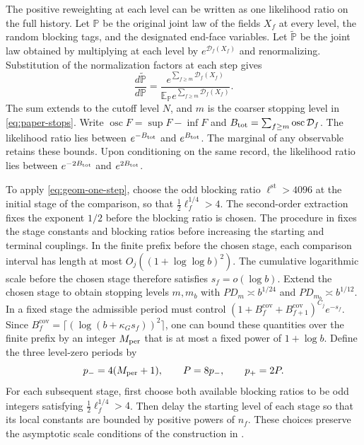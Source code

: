 \documentclass[11pt,a4paper]{article}
\numberwithin{equation}{section}
\begin{document}
The positive reweighting at each level can be written as one likelihood ratio on the full history. Let \(\mathbb P\) be the original joint law of the fields \(X_f\) at every level, the random blocking tags, and the designated end-face variables. Let \(\widetilde{\mathbb P}\) be the joint law obtained by multiplying at each level by \(e^{\mathcal D_f(X_f)}\) and renormalizing. Substitution of the normalization factors at each step gives
\begin{equation}
 \frac{d\widetilde{\mathbb P}}{d\mathbb P}
 =\frac{e^{\sum_{f\ge m}\mathcal D_f(X_f)}}
        {\mathbb E_{\mathbb P}e^{\sum_{f\ge m}\mathcal D_f(X_f)}} .
 \label{eq:geom-history-resets}
\end{equation}
The sum extends to the cutoff level \(N\), and \(m\) is the coarser stopping level in \eqref{eq:paper-stops}. Write \(\operatorname{osc}F=\sup F-\inf F\) and \(B_{\rm tot}=\sum_{f\ge m}\operatorname{osc}\mathcal D_f\). The likelihood ratio lies between \(e^{-B_{\rm tot}}\) and \(e^{B_{\rm tot}}\). The marginal of any observable retains these bounds. Upon conditioning on the same record, the likelihood ratio lies between \(e^{-2B_{\rm tot}}\) and \(e^{2B_{\rm tot}}\).

To apply \eqref{eq:geom-one-step}, choose the odd blocking ratio \(\ell^{\mathrm{st}}>4096\) at the initial stage of the comparison, so that \(\tfrac12\ell_f^{1/4}>4\). The second-order extraction fixes the exponent \(1/2\) before the blocking ratio is chosen. The procedure in \cite[Table 3]{armstrong} fixes the stage constants and blocking ratios before increasing the starting and terminal couplings. In the finite prefix before the chosen stage, each comparison interval has length at most \(O_j((1+\log\log b)^2)\). The cumulative logarithmic scale before the chosen stage therefore satisfies \(s_f=o(\log b)\). Extend the chosen stage to obtain stopping levels \(m,m_b\) with \(PD_m\asymp b^{1/24}\) and \(PD_{m_b}\asymp b^{1/12}\). In a fixed stage the admissible period must control \((1+B_f^{\mathrm{cov}}+B_{f+1}^{\mathrm{cov}})^{C_j}e^{-s_f}\). Since \(B_f^{\mathrm{cov}}=\lceil(\log(b+\kappa_Gs_f))^2\rceil\), one can bound these quantities over the finite prefix by an integer \(M_{\rm per}\) that is at most a fixed power of \(1+\log b\). Define the three level-zero periods by
\[
 p_-=4(M_{\rm per}+1),\qquad P=8p_-,\qquad p_+=2P .
\]
For each subsequent stage, first choose both available blocking ratios to be odd integers satisfying \(\tfrac12\ell_f^{1/4}>4\). Then delay the starting level of each stage so that its local constants are bounded by positive powers of \(n_f\). These choices preserve the asymptotic scale conditions of the construction in \cite[Lemmas 14.2 and 14.4]{armstrong}.
\end{document}
